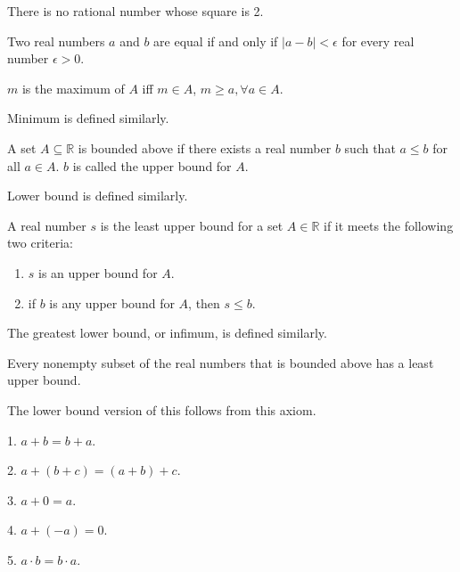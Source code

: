 \documentclass{article}
\begin{document}
\pagecolor{black}
\color{white}


    There is no rational number whose square is 2.

\medskip
{}

    Two real numbers $a$ and $b$ are equal if and only if $|a-b| < \epsilon$ for every real number $\epsilon > 0$.

\medskip
{}
    
    $m$ is the maximum of $A$ iff $m \in A$, $m \geq a, \forall a\in A$.
    
    Minimum is defined similarly.

\medskip
{}
    
    A set $A \subseteq \mathbb R$ is bounded above if there exists a real number $b$ such that $a \leq b$ for all $a \in A$. $b$ is called the upper bound for $A$.
    
    Lower bound is defined similarly.

\medskip
{}

    A real number $s$ is the least upper bound for a set $A \in \mathbb R$ if it meets the following two criteria:
    \begin{enumerate}
        \item $s$ is an upper bound for $A$.
        \item if $b$ is any upper bound for $A$, then $s \leq b$.
    \end{enumerate}
    
    The greatest lower bound, or infimum, is defined similarly.

\medskip
{}

    Every nonempty subset of the real numbers that is bounded above has a least upper bound.
    
    The lower bound version of this follows from this axiom.

\medskip
{}

    1. $a + b = b + a$.
    
    2. $a + (b + c) = (a + b) + c$.
    
    3. $a + 0 = a$.

    4. $a + (-a) = 0$.

    5. $a \cdot b = b \cdot a$.
    
\end{document}
